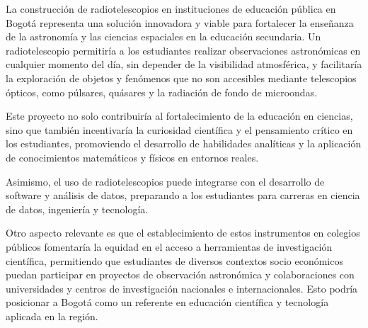 La construcción de radiotelescopios en instituciones de educación pública en
Bogotá representa una solución innovadora y viable para fortalecer la enseñanza
de la astronomía y las ciencias espaciales en la educación secundaria.
Un radiotelescopio permitiría a los estudiantes realizar observaciones
astronómicas en cualquier momento del día, sin depender de la visibilidad
atmosférica, y facilitaría la exploración de objetos y fenómenos que no son
accesibles mediante telescopios ópticos, como púlsares, quásares y la radiación
de fondo de microondas.

Este proyecto no solo contribuiría al fortalecimiento de la educación en
ciencias, sino que también incentivaría la curiosidad científica y el
pensamiento crítico en los estudiantes, promoviendo el desarrollo de
habilidades analíticas y la aplicación de conocimientos matemáticos y físicos
en entornos reales.

Asimismo, el uso de radiotelescopios puede integrarse con el desarrollo de
software y análisis de datos, preparando a los estudiantes para carreras en
ciencia de datos, ingeniería y tecnología.

Otro aspecto relevante es que el establecimiento de estos instrumentos en
colegios públicos fomentaría la equidad en el acceso a herramientas de
investigación científica, permitiendo que estudiantes de diversos contextos
socio económicos puedan participar en proyectos de observación astronómica y
colaboraciones con universidades y centros de investigación nacionales e
internacionales.
Esto podría posicionar a Bogotá como un referente en educación científica y
tecnología aplicada en la región.
